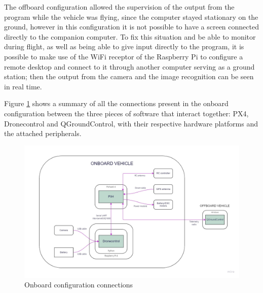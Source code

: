 The offboard configuration allowed the supervision of the output from the program while the vehicle was flying, since the computer stayed stationary on the ground, however in this configuration it is not possible to have a screen connected directly to the companion computer.
To fix this situation and be able to monitor during flight, as well as being able to give input directly to the program, it is possible to make use of the WiFi receptor of the Raspberry Pi to configure a remote desktop and connect to it through another computer serving as a ground station;
then the output from the camera and the image recognition can be seen in real time.

Figure \ref{fig:onboard-config} shows a summary of all the connections present in the onboard configuration between the three pieces of software that interact together: PX4, Dronecontrol and QGroundControl, with their respective hardware platforms and the attached peripherals.

\begin{figure}
  \centering
  \includegraphics[width=\textwidth,keepaspectratio]{img/onboard-diagram.jpg}
  \caption{Onboard configuration connections}
  \label{fig:onboard-config}
\end{figure}
